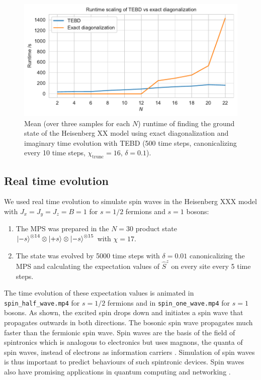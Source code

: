 \documentclass[a4paper, headsepline, footheight=13.6pt]{scrartcl}
\begin{document}
\begin{figure}[htbp]
    \centering
    \includegraphics[width=\textwidth]{figures/runtimes.pdf}
    \caption{Mean (over three samples for each $N$) runtime of finding the ground state of the Heisenberg XX model using exact diagonalization and imaginary time evolution with TEBD (500 time steps, canonicalizing every 10 time steps, $\chi_\text{trunc}=16$, $\delta=0.1$).}
    \label{fig:runtimes}
\end{figure}

\subsection{Real time evolution} \label{subsec:real_time_evol}
We used real time evolution to simulate spin waves in the Heisenberg XXX model with $J_x=J_y=J_z=B=1$ for $s=1/2$ fermions and $s=1$ bosons:
\begin{enumerate}
    \item The MPS was prepared in the $N=30$ product state $\ket{-s}^{\otimes 14} \otimes \ket{+s} \otimes \ket{-s}^{\otimes 15}$ with $\chi=17$. 
    \item The state was evolved by 5000 time steps with $\delta=0.01$ canonicalizing the MPS and calculating the expectation values of $\hat{S}^z$ on every site every 5 time steps.
\end{enumerate}
The time evolution of these expectation values is animated in \verb|spin_half_wave.mp4| for $s=1/2$ fermions and in \verb|spin_one_wave.mp4| for $s=1$ bosons. As shown, the excited spin drops down and initiates a spin wave that propagates outwards in both directions. The bosonic spin wave propagates much faster than the fermionic spin wave. Spin waves are the basis of the field of spintronics which is analogous to electronics but uses magnons, the quanta of spin waves, instead of electrons as information carriers \cite{Hortensius:2021aa}. Simulation of spin waves is thus important to predict behaviours of such spintronic devices. Spin waves also have promising applications in quantum computing and networking \cite{Cox:2022aa}.
\end{document}
